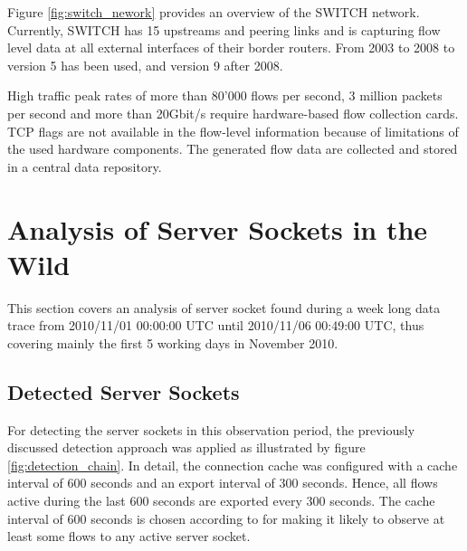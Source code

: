 Figure \ref{fig:switch_nework} provides an overview of the SWITCH network. 
Currently, SWITCH has 15 upstreams and peering links and is capturing flow level data at all external interfaces of their border routers. From 2003 to 2008 to version 5 has been used, and version 9 after 2008\citep{Schatzmann:Tracing}.

High traffic peak rates of more than 80'000 flows per second, 3 million packets per second and more than 20Gbit/s require hardware-based flow collection cards\citep{Schatzmann:Tracing}. 
\gls{TCP} flags are not available in the flow-level information because of limitations of the used hardware components\citep{Schatzmann:Tracing}. 
The generated flow data are collected and stored in a central data repository.

\section{Analysis of Server Sockets in the Wild\label{section:analysis_in_wild}}

This section covers an analysis of \gls{server socket} found during a week long data trace from 2010/11/01 00:00:00 UTC until 2010/11/06 00:49:00 UTC, thus covering mainly the first 5 working days in November 2010.

\subsection{Detected Server Sockets}

For detecting the \glspl{server socket} in this observation period, the previously discussed detection approach was applied as illustrated by figure \ref{fig:detection_chain}. 
In detail, the connection cache was configured with a cache interval of 600 seconds and an export interval of 300 seconds. Hence, all flows active during the last 600 seconds are exported every 300 seconds. The cache interval of 600 seconds is chosen according to \citet{Schatzmann:Tracing} for making it likely to observe at least some flows to any active server socket. 

